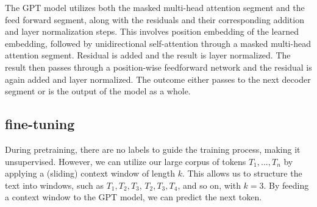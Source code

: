 \documentclass[
	11pt,
	a4paper,
	figtabcapt,
]{oblivoir}
\begin{document}
The GPT model utilizes both the masked multi-head attention segment and the feed forward segment, along with the residuals and their corresponding addition and layer normalization steps.
This involves position embedding of the learned embedding, followed by unidirectional self-attention through a masked multi-head attention segment. Residual is added and the result is layer normalized. The result then passes through a position-wise feedforward network and the residual is again added and layer normalized.
The outcome either passes to the next decoder segment or is the output of the model as a whole.

\subsection{fine-tuning}
During pretraining, there are no labels to guide the training process, making it unsupervised.
However, we can utilize our large corpus of tokens $T_1, ..., T_n$ by applying a (sliding) context window of length $k$.
This allows us to structure the text into windows, such as $T_1, T_2, T_3$, $T_2, T_3, T_4$, and so on, with $k=3$.
By feeding a context window to the GPT model, we can predict the next token.



\clearpage
\end{document}
